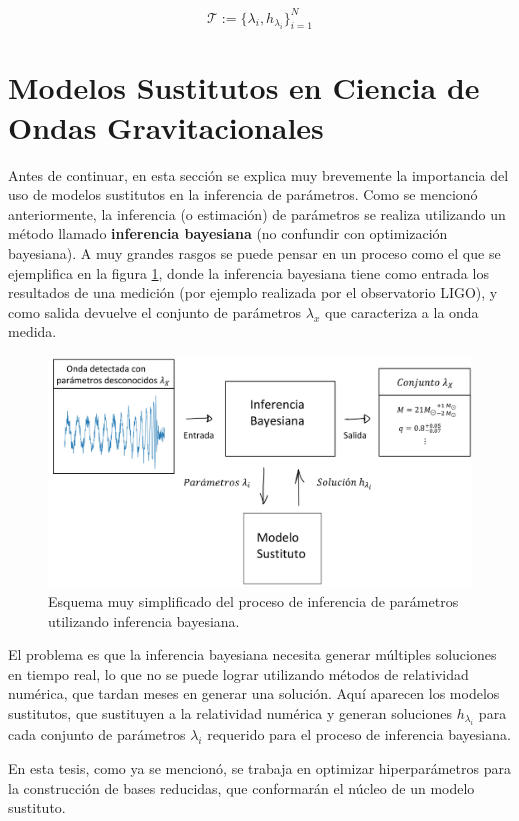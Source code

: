 \[
\mathcal{T} := \{ \lambda_i, h_{\lambda_i} \}_{i=1}^N
\]

\section{Modelos Sustitutos en Ciencia de Ondas Gravitacionales}

Antes de continuar, en esta sección se explica muy brevemente la importancia del uso de modelos sustitutos en la inferencia de parámetros.
Como se mencionó anteriormente, la inferencia (o estimación) de parámetros se realiza utilizando un método llamado \textbf{inferencia bayesiana} (no confundir con optimización bayesiana). A muy grandes rasgos se puede pensar en un proceso como el que se ejemplifica en la figura \ref{fig:diagrama}, donde la inferencia bayesiana tiene como entrada los resultados de una medición (por ejemplo realizada por el observatorio LIGO), y como salida devuelve el conjunto de parámetros $\lambda_x$ que caracteriza a la onda medida.  

\begin{figure}[h!]
\centering
\includegraphics[width=.8\columnwidth]{figs/diagrama-importancia-modelos.png}
\caption{Esquema muy simplificado del proceso de inferencia de parámetros utilizando inferencia bayesiana.}
\label{fig:diagrama}
\end{figure}

El problema es que la inferencia bayesiana necesita generar múltiples soluciones en tiempo real, lo que no se puede lograr utilizando métodos de relatividad numérica, que tardan meses en generar una solución. Aquí aparecen los modelos sustitutos, que sustituyen a la relatividad numérica y generan soluciones $h_{\lambda_i}$ para cada conjunto de parámetros $\lambda_i$ requerido para el proceso de inferencia bayesiana.

En esta tesis, como ya se mencionó, se trabaja en optimizar hiperparámetros para la construcción de bases reducidas, que conformarán el núcleo de un modelo sustituto.




